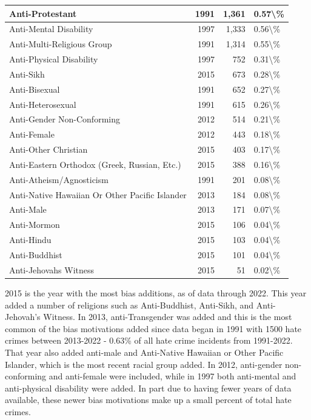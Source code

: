 \documentclass[
]{krantz}
\begin{document}
\begin{longtable}[t]{l|r|r|l}
\hline
Anti-Protestant & 1991 & 1,361 & 0.57\textbackslash{}\%\\
\hline
Anti-Mental Disability & 1997 & 1,333 & 0.56\textbackslash{}\%\\
\hline
Anti-Multi-Religious Group & 1991 & 1,314 & 0.55\textbackslash{}\%\\
\hline
Anti-Physical Disability & 1997 & 752 & 0.31\textbackslash{}\%\\
\hline
Anti-Sikh & 2015 & 673 & 0.28\textbackslash{}\%\\
\hline
Anti-Bisexual & 1991 & 652 & 0.27\textbackslash{}\%\\
\hline
Anti-Heterosexual & 1991 & 615 & 0.26\textbackslash{}\%\\
\hline
Anti-Gender Non-Conforming & 2012 & 514 & 0.21\textbackslash{}\%\\
\hline
Anti-Female & 2012 & 443 & 0.18\textbackslash{}\%\\
\hline
Anti-Other Christian & 2015 & 403 & 0.17\textbackslash{}\%\\
\hline
Anti-Eastern Orthodox (Greek, Russian, Etc.) & 2015 & 388 & 0.16\textbackslash{}\%\\
\hline
Anti-Atheism/Agnosticism & 1991 & 201 & 0.08\textbackslash{}\%\\
\hline
Anti-Native Hawaiian Or Other Pacific Islander & 2013 & 184 & 0.08\textbackslash{}\%\\
\hline
Anti-Male & 2013 & 171 & 0.07\textbackslash{}\%\\
\hline
Anti-Mormon & 2015 & 106 & 0.04\textbackslash{}\%\\
\hline
Anti-Hindu & 2015 & 103 & 0.04\textbackslash{}\%\\
\hline
Anti-Buddhist & 2015 & 101 & 0.04\textbackslash{}\%\\
\hline
Anti-Jehovahs Witness & 2015 & 51 & 0.02\textbackslash{}\%\\
\hline
\end{longtable}

2015 is the year with the most bias additions, as of data
through 2022. This year added a number of religions such as
Anti-Buddhist, Anti-Sikh, and Anti-Jehovah's Witness. In
2013, anti-Transgender was added and this is the most common
of the bias motivations added since data began in 1991 with
1500 hate crimes between 2013-2022 - 0.63\% of all hate
crime incidents from 1991-2022. That year also added
anti-male and Anti-Native Hawaiian or Other Pacific
Islander, which is the most recent racial group added. In
2012, anti-gender non-conforming and anti-female were
included, while in 1997 both anti-mental and anti-physical
disability were added. In part due to having fewer years of
data available, these newer bias motivations make up a small
percent of total hate crimes.
\end{document}
